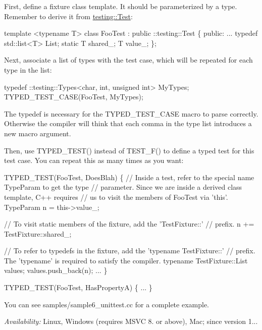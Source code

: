 First, define a fixture class template. It should be parameterized by a type. Remember to derive it from {\ttfamily \mbox{\hyperlink{classtesting_1_1_test}{testing\+::\+Test}}}\+:


\begin{DoxyCode}
template <typename T>
class FooTest : public ::testing::Test \{
 public:
  ...
  typedef std::list<T> List;
  static T shared\_;
  T value\_;
\};
\end{DoxyCode}


Next, associate a list of types with the test case, which will be repeated for each type in the list\+:


\begin{DoxyCode}
typedef ::testing::Types<char, int, unsigned int> MyTypes;
TYPED\_TEST\_CASE(FooTest, MyTypes);
\end{DoxyCode}


The {\ttfamily typedef} is necessary for the {\ttfamily T\+Y\+P\+E\+D\+\_\+\+T\+E\+S\+T\+\_\+\+C\+A\+SE} macro to parse correctly. Otherwise the compiler will think that each comma in the type list introduces a new macro argument.

Then, use {\ttfamily T\+Y\+P\+E\+D\+\_\+\+T\+E\+S\+T()} instead of {\ttfamily T\+E\+S\+T\+\_\+\+F()} to define a typed test for this test case. You can repeat this as many times as you want\+:


\begin{DoxyCode}
TYPED\_TEST(FooTest, DoesBlah) \{
  // Inside a test, refer to the special name TypeParam to get the type
  // parameter.  Since we are inside a derived class template, C++ requires
  // us to visit the members of FooTest via 'this'.
  TypeParam n = this->value\_;

  // To visit static members of the fixture, add the 'TestFixture::'
  // prefix.
  n += TestFixture::shared\_;

  // To refer to typedefs in the fixture, add the 'typename TestFixture::'
  // prefix.  The 'typename' is required to satisfy the compiler.
  typename TestFixture::List values;
  values.push\_back(n);
  ...
\}

TYPED\_TEST(FooTest, HasPropertyA) \{ ... \}
\end{DoxyCode}


You can see {\ttfamily samples/sample6\+\_\+unittest.\+cc} for a complete example.

{\itshape Availability\+:} Linux, Windows (requires M\+S\+VC 8. or above), Mac; since version 1...


